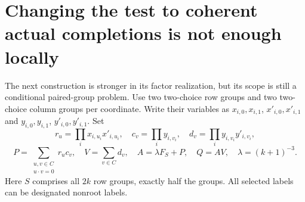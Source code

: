 \documentclass[11pt]{article}
\begin{document}
\section{Changing the test to coherent actual completions is not enough locally}
The next construction is stronger in its factor realization, but its
scope is still a conditional paired-group problem.
Use two two-choice row groups and two two-choice column groups
per coordinate. Write their variables as
$x_{i,0},x_{i,1}$, $x'_{i,0},x'_{i,1}$ and
$y_{i,0},y_{i,1}$, $y'_{i,0},y'_{i,1}$.
Set
\[
 r_u=\prod_i x_{i,u_i}x'_{i,u_i},\quad
 c_v=\prod_i y_{i,v_i},\quad d_v=\prod_i y_{i,v_i}y'_{i,v_i},
\]
\[
 P=\sum_{\substack{u,v\in C\\u\cdot v=0}}r_uc_v,\quad
 V=\sum_{v\in C}d_v,\quad
 A=\lambda F_S+P,\quad Q=AV,\quad \lambda=(k+1)^{-3}.    \tag{ST8}
\]
Here $S$ comprises all $2k$ row groups, exactly half the groups.
All selected labels can be designated nonroot labels.
\end{document}
